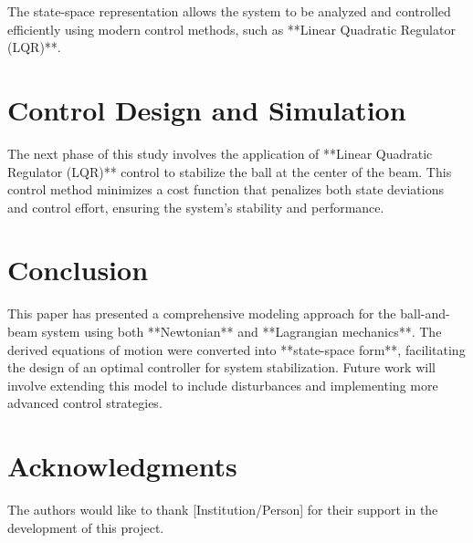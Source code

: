 \documentclass[conference]{IEEEtran}
\begin{document}
The state-space representation allows the system to be analyzed and controlled efficiently using modern control methods, such as **Linear Quadratic Regulator (LQR)**.

\section{Control Design and Simulation}
The next phase of this study involves the application of **Linear Quadratic Regulator (LQR)** control to stabilize the ball at the center of the beam. This control method minimizes a cost function that penalizes both state deviations and control effort, ensuring the system's stability and performance.

\section{Conclusion}
This paper has presented a comprehensive modeling approach for the ball-and-beam system using both **Newtonian** and **Lagrangian mechanics**. The derived equations of motion were converted into **state-space form**, facilitating the design of an optimal controller for system stabilization. Future work will involve extending this model to include disturbances and implementing more advanced control strategies.

\section*{Acknowledgments}
The authors would like to thank [Institution/Person] for their support in the development of this project.



\end{document}
